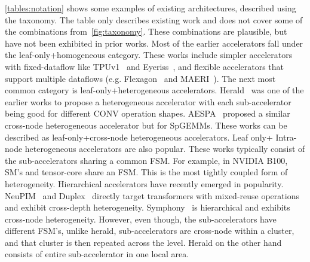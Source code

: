 \autoref{tables:notation} shows some examples of existing architectures, described using the \HHPName taxonomy. The table only describes existing work and does not cover some of the combinations from~\autoref{fig:taxonomy}. These combinations are plausible, but have not been exhibited in prior works. Most of the earlier accelerators fall under the leaf-only+homogeneous category. These works include simpler accelerators with fixed-dataflow like TPUv1~\cite{tpu-isca} and Eyeriss~\cite{eyeriss2016isca}, and flexible accelerators that support multiple dataflows (e.g. Flexagon~\cite{flexagon} and MAERI~\cite{kwon2018maeri}). The next most common category is leaf-only+heterogeneous accelerators. Herald~\cite{kwon2021heterogeneous} was one of the earlier works to propose a heterogeneous accelerator with each sub-accelerator being good for different CONV operation shapes. AESPA~\cite{qin2022enabling} proposed a similar cross-node heterogeneous accelerator but for SpGEMMs. These works can be described as leaf-only+cross-node heterogeneous accelerators. Leaf only+ Intra-node heterogeneous accelerators are also popular. These works typically consist of the sub-accelerators sharing a common FSM. For example, in NVIDIA B100, SM's and tensor-core share an FSM. This is the most tightly coupled form of heterogeneity. Hierarchical accelerators have recently emerged in popularity. NeuPIM~\cite{neupim} and Duplex~\cite{duplex} directly target transformers with mixed-reuse operations and exhibit cross-depth heterogeneity. Symphony~\cite{symphony} is hierarchical and exhibits cross-node heterogeneity. However, even though, the sub-accelerators have different FSM's, unlike herald, sub-accelerators are cross-node within a cluster, and that cluster is then repeated across the level. Herald on the other hand consists of entire sub-accelerator in one local area.



